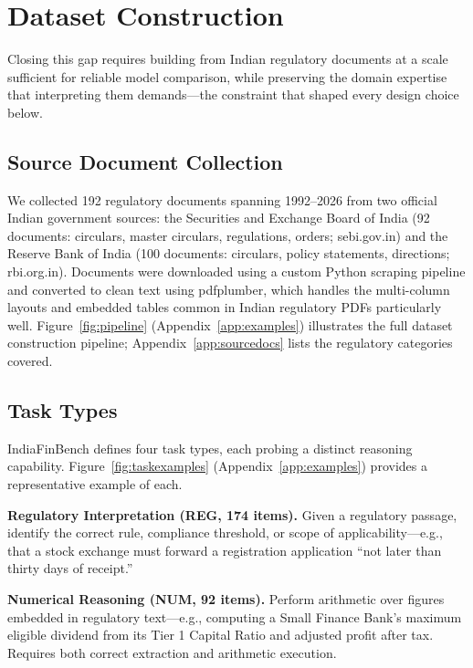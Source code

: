 \section{Dataset Construction}

Closing this gap requires building from Indian regulatory documents at a scale sufficient for reliable model comparison, while preserving the domain expertise that interpreting them demands---the constraint that shaped every design choice below.

\subsection{Source Document Collection}

We collected 192 regulatory documents spanning 1992--2026 from two official Indian government sources: the Securities and Exchange Board of India (92 documents: circulars, master circulars, regulations, orders; sebi.gov.in) and the Reserve Bank of India (100 documents: circulars, policy statements, directions; rbi.org.in). Documents were downloaded using a custom Python scraping pipeline and converted to clean text using pdfplumber, which handles the multi-column layouts and embedded tables common in Indian regulatory PDFs particularly well. Figure~\ref{fig:pipeline} (Appendix~\ref{app:examples}) illustrates the full dataset construction pipeline; Appendix~\ref{app:sourcedocs} lists the regulatory categories covered.

\subsection{Task Types}

IndiaFinBench defines four task types, each probing a distinct reasoning capability. Figure~\ref{fig:taskexamples} (Appendix~\ref{app:examples}) provides a representative example of each.

\textbf{Regulatory Interpretation (REG, 174 items).} Given a regulatory passage, identify the correct rule, compliance threshold, or scope of applicability---e.g., that a stock exchange must forward a registration application ``not later than thirty days of receipt.''

\textbf{Numerical Reasoning (NUM, 92 items).} Perform arithmetic over figures embedded in regulatory text---e.g., computing a Small Finance Bank's maximum eligible dividend from its Tier 1 Capital Ratio and adjusted profit after tax. Requires both correct extraction and arithmetic execution.

